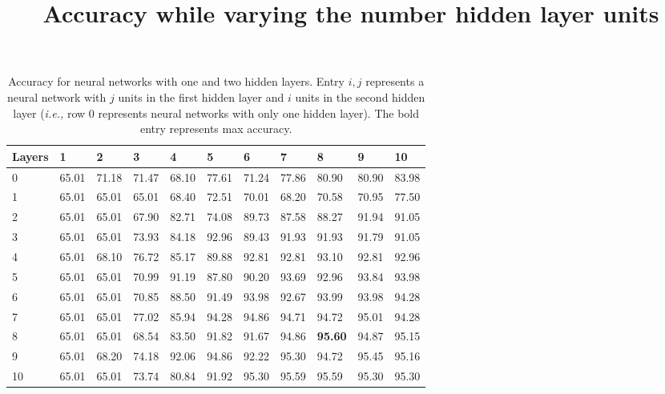 \begin{table}

    \begin{center}
      \title{Accuracy while varying the number hidden layer units}
      \begin{tabular}{|l|l|l|l|l|l|l|l|l|l|l|}
        \hline
        Layers & 1     & 2     & 3     & 4     & 5     & 6     & 7     & 8     & 9     & 10    \\ \hline
        0               & 65.01 & 71.18 & 71.47 & 68.10 & 77.61 & 71.24 & 77.86 & 80.90 & 80.90 & 83.98 \\ \hline
        1               & 65.01 & 65.01 & 65.01 & 68.40 & 72.51 & 70.01 & 68.20 & 70.58 & 70.95 & 77.50 \\ \hline
        2               & 65.01 & 65.01 & 67.90 & 82.71 & 74.08 & 89.73 & 87.58 & 88.27 & 91.94 & 91.05 \\ \hline
        3               & 65.01 & 65.01 & 73.93 & 84.18 & 92.96 & 89.43 & 91.93 & 91.93 & 91.79 & 91.05 \\ \hline
        4               & 65.01 & 68.10 & 76.72 & 85.17 & 89.88 & 92.81 & 92.81 & 93.10 & 92.81 & 92.96 \\ \hline
        5               & 65.01 & 65.01 & 70.99 & 91.19 & 87.80 & 90.20 & 93.69 & 92.96 & 93.84 & 93.98 \\ \hline
        6               & 65.01 & 65.01 & 70.85 & 88.50 & 91.49 & 93.98 & 92.67 & 93.99 & 93.98 & 94.28 \\ \hline
        7               & 65.01 & 65.01 & 77.02 & 85.94 & 94.28 & 94.86 & 94.71 & 94.72 & 95.01 & 94.28 \\ \hline
        8               & 65.01 & 65.01 & 68.54 & 83.50 & 91.82 & 91.67 & 94.86 & {\bf 95.60} & 94.87 & 95.15 \\ \hline
        9               & 65.01 & 68.20 & 74.18 & 92.06 & 94.86 & 92.22 & 95.30 & 94.72 & 95.45 & 95.16 \\ \hline
        10              & 65.01 & 65.01 & 73.74 & 80.84 & 91.92 & 95.30 & 95.59 & 95.59 & 95.30 & 95.30 \\ \hline
      \end{tabular}
    \end{center}
    \label{tab:breast}
    \caption {Accuracy for neural networks with one and two hidden layers. Entry \(i,j\) represents a neural network with \(j\) units in the first hidden layer and \(i\) units in the second hidden layer ({\em i.e.,} row 0 represents neural networks with only one hidden layer). The bold entry represents max accuracy.}

\end{table}


